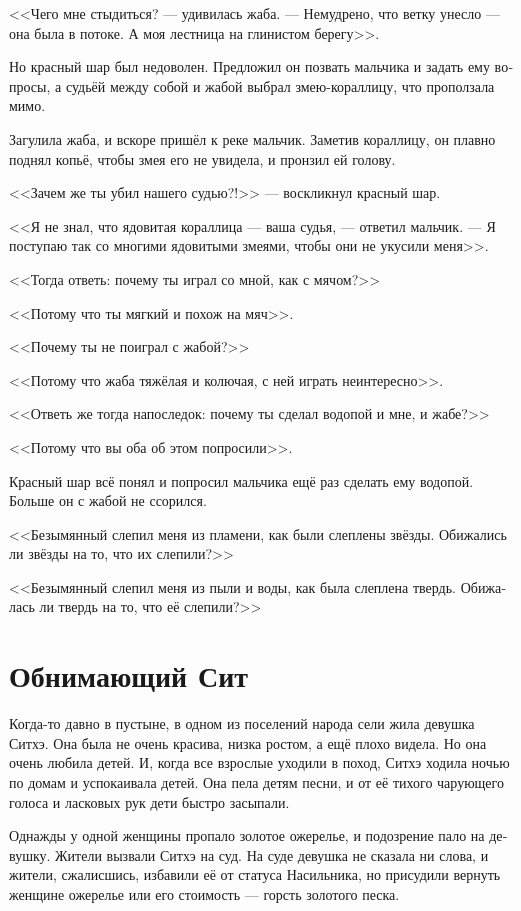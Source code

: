 \documentclass[a4paper,12pt,fleqn]{book}\usepackage{cooltooltips}\usepackage{polyglossia}\setdefaultlanguage[babelshorthands=true]{russian}\setotherlanguage{english}\defaultfontfeatures{Ligatures=TeX,Mapping=tex-text} \usepackage{xcolor}\definecolor{lightgray}{HTML}{bbbbbb}\color{lightgray}\newcommand{\ml}[3]{\textenglish{\textcolor{black}{#3}}}
\newcommand{\textspace}{\vspace{1em}{\centering\Large\bfseries<...>\par}\vspace{1em}}
\begin{document}
{<<Чего мне стыдиться? --- удивилась жаба.
--- Немудрено, что ветку унесло --- она была в потоке.
А моя лестница на глинистом берегу>>.

Но красный шар был недоволен.
Предложил он позвать мальчика и задать ему вопросы, а судьёй между собой и жабой выбрал змею-кораллицу, что проползала мимо.

Загулила жаба, и вскоре пришёл к реке мальчик.
Заметив кораллицу, он плавно поднял копьё, чтобы змея его не увидела, и пронзил ей голову.

<<Зачем же ты убил нашего судью?!>> --- воскликнул красный шар.

<<Я не знал, что ядовитая кораллица --- ваша судья, --- ответил мальчик.
--- Я поступаю так со многими ядовитыми змеями, чтобы они не укусили меня>>.

<<Тогда ответь: почему ты играл со мной, как с мячом?>>

<<Потому что ты мягкий и похож на мяч>>.

<<Почему ты не поиграл с жабой?>>

<<Потому что жаба тяжёлая и колючая, с ней играть неинтересно>>.

<<Ответь же тогда напоследок: почему ты сделал водопой и мне, и жабе?>>

<<Потому что вы оба об этом попросили>>.

Красный шар всё понял и попросил мальчика ещё раз сделать ему водопой.
Больше он с жабой не ссорился.

\textspace

<<Безымянный слепил меня из пламени, как были слеплены звёзды.
Обижались ли звёзды на то, что их слепили?>>

<<Безымянный слепил меня из пыли и воды, как была слеплена твердь.
Обижалась ли твердь на то, что её слепили?>>

\section{Обнимающий Сит}

Когда-то давно в пустыне, в одном из поселений народа сели жила девушка Ситхэ.
Она была не очень красива, низка ростом, а ещё плохо видела.
Но она очень любила детей.
И, когда все взрослые уходили в поход, Ситхэ ходила ночью по домам и успокаивала детей.
Она пела детям песни, и от её тихого чарующего голоса и ласковых рук дети быстро засыпали.

Однажды у одной женщины пропало золотое ожерелье, и подозрение пало на девушку.
Жители вызвали Ситхэ на суд.
На суде девушка не сказала ни слова, и жители, сжалисшись, избавили её от статуса Насильника, но присудили вернуть женщине ожерелье или его стоимость --- горсть золотого песка.

}
\end{document}
